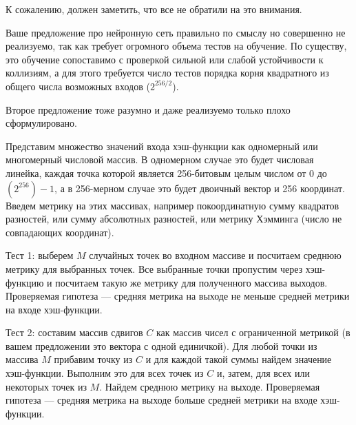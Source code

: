 \documentclass[10pt]{article}
\begin{document}
К сожалению, должен заметить, что все не обратили на это внимания.

Ваше предложение про нейронную сеть правильно по смыслу но совершенно не реализуемо, так как требует огромного объема тестов на обучение. По существу, это обучение сопоставимо с проверкой сильной или слабой устойчивости к коллизиям, а для этого требуется число тестов порядка корня квадратного из общего числа возможных входов ($2^{256/2}$).

Второе предложение тоже разумно и даже реализуемо только плохо сформулировано.

Представим множество значений входа хэш-функции как одномерный или многомерный числовой массив. В одномерном случае это будет числовая линейка, каждая точка которой является 256-битовым целым числом от 0 до $(2^{256})-1$,  а в 256-мерном случае это будет двоичный вектор и 256 координат. Введем метрику на этих массивах, например покоординатную сумму квадратов разностей, или сумму абсолютных разностей, или метрику Хэмминга (число не совпадающих координат).

Тест 1:  выберем $M$ случайных точек во входном массиве и посчитаем среднюю метрику для выбранных точек. Все выбранные точки пропустим через хэш-функцию и посчитаем такую же метрику для полученного массива выходов. Проверяемая гипотеза --- средняя метрика на выходе не меньше средней метрики на входе хэш-функции.

Тест 2:  составим массив сдвигов $C$ как массив чисел с ограниченной метрикой (в вашем предложении это вектора с одной единичкой). Для любой точки из массива $M$ прибавим точку из $C$ и для каждой такой суммы найдем значение хэш-функции. Выполним это для всех точек из $C$ и, затем, для всех или некоторых точек из $M$. Найдем  среднюю метрику на выходе. Проверяемая гипотеза --- средняя метрика на выходе больше средней метрики на входе хэш-функции.
\end{document}

